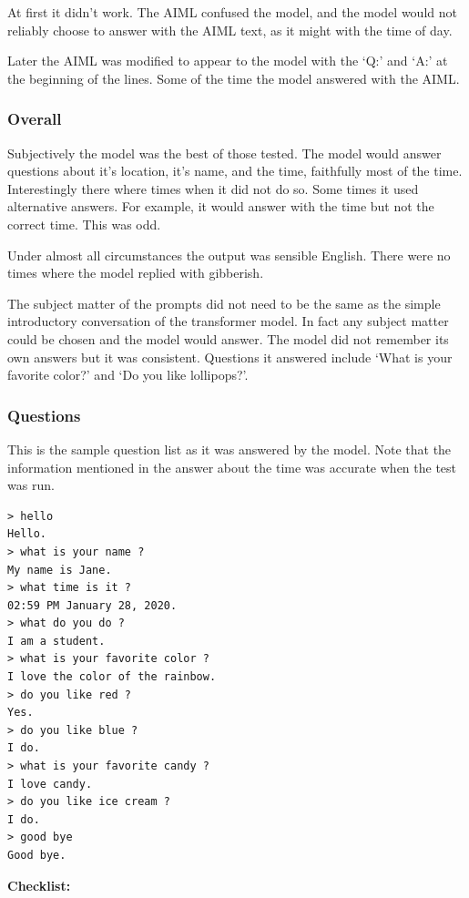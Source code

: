 At first it didn't work. The AIML confused the model, and the model would not reliably choose to answer with the AIML text, as it might with the time of day.

Later the AIML was modified to appear to the model with the `Q:' and `A:' at the beginning of the lines. Some of the time the model answered with the AIML. 

\subsubsection{Overall}

Subjectively the model was the best of those tested. The model would answer questions about it's location, it's name, and the time, faithfully most of the time. Interestingly there where times when it did not do so. Some times it used alternative answers. For example, it would answer with the time but not the correct time. This was odd.

Under almost all circumstances the output was sensible English. There were no times where the model replied with gibberish. 

The subject matter of the prompts did not need to be the same as the simple introductory conversation of the transformer model. In fact any subject matter could be chosen and the model would answer. The model did not remember its own answers but it was consistent. Questions it answered include `What is your favorite color?' and `Do you like lollipops?'. 

\subsubsection*{Questions}
This is the sample question list as it was answered by the model. Note that the information mentioned in the answer about the time was accurate when the test was run.

\begin{verbatim}
> hello
Hello.
> what is your name ?
My name is Jane.
> what time is it ?
02:59 PM January 28, 2020.
> what do you do ?
I am a student.
> what is your favorite color ?
I love the color of the rainbow.
> do you like red ?
Yes.
> do you like blue ?
I do.
> what is your favorite candy ?
I love candy.
> do you like ice cream ?
I do. 
> good bye
Good bye.
\end{verbatim}

\noindent \textbf{Checklist:} 


